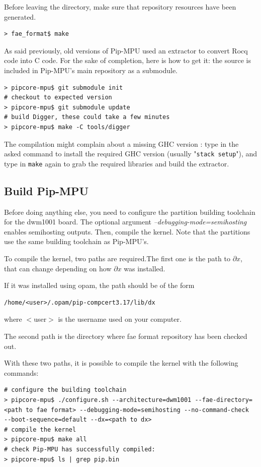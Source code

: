 \documentclass[10pt,a4paper,titlepage]{refart}
\begin{document}
Before leaving the directory, make sure that repository resources have been generated.
\begin{lstlisting}[style=BashStyle]
> fae_format$ make
\end{lstlisting}

As said previously, old versions of Pip-MPU used an extractor to convert Rocq code into C code.
For the sake of completion, here is how to get it: the source is included in Pip-MPU's main repository as a submodule.
\begin{lstlisting}[style=BashStyle]
> pipcore-mpu$ git submodule init
# checkout to expected version
> pipcore-mpu$ git submodule update
# build Digger, these could take a few minutes
> pipcore-mpu$ make -C tools/digger
\end{lstlisting}
The compilation might complain about a missing GHC version : type in the asked command to install the required GHC version (usually "\texttt{stack setup}"), and type in \texttt{make} again to grab the required libraries and build the extractor.

\subsection{Build Pip-MPU} \label{buildpip}
Before doing anything else, you need to configure the partition building toolchain for the dwm1001 board.
The optional argument \textit{--debugging-mode=semihosting} enables semihosting outputs.
Then, compile the kernel.
Note that the partitions use the same building toolchain as Pip-MPU's.

To compile the kernel, two paths are required.The first one is the path to $\partial x$, that can change depending on how
$\partial x$ was installed.

If it was installed using opam, the path should be of the form

\begin{lstlisting}[style=BashStyle]
/home/<user>/.opam/pip-compcert3.17/lib/dx
\end{lstlisting}

where $<$user$>$ is the username used on your computer.

The second path is the directory where fae format repository has been checked out.

With these two paths, it is possible to compile the kernel with the following commands:

\begin{lstlisting}[style=BashStyle]
# configure the building toolchain
> pipcore-mpu$ ./configure.sh --architecture=dwm1001 --fae-directory=<path to fae format> --debugging-mode=semihosting --no-command-check  --boot-sequence=default --dx=<path to dx>
# compile the kernel
> pipcore-mpu$ make all
# check Pip-MPU has successfully compiled:
> pipcore-mpu$ ls | grep pip.bin
\end{lstlisting}
\end{document}
